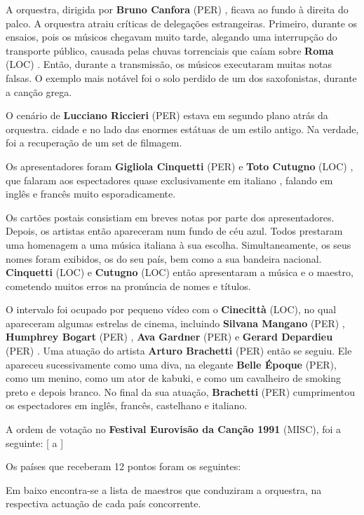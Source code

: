 \documentclass[12pt,a4paper]{article}
\begin{document}
A orquestra, dirigida por \textbf{Bruno Canfora} (PER) , ficava ao fundo à direita do palco. A orquestra atraiu críticas de delegações estrangeiras. Primeiro, durante os ensaios, pois os músicos chegavam muito tarde, alegando uma interrupção do transporte público, causada pelas chuvas torrenciais que caíam sobre \textbf{Roma} (LOC) . Então, durante a transmissão, os músicos executaram muitas notas falsas. O exemplo mais notável foi o solo perdido de um dos saxofonistas, durante a canção grega.

O cenário de \textbf{Lucciano Riccieri} (PER) estava em segundo plano atrás da orquestra. cidade e no lado das enormes estátuas de um estilo antigo. Na verdade, foi a recuperação de um set de filmagem.

Os apresentadores foram \textbf{Gigliola Cinquetti} (PER) e \textbf{Toto Cutugno} (LOC) , que falaram aos espectadores quase exclusivamente em italiano , falando em inglês e francês muito esporadicamente.

Os cartões postais consistiam em breves notas por parte dos apresentadores. Depois, os artistas então apareceram num fundo de céu azul. Todos prestaram uma homenagem a uma música italiana à sua escolha. Simultaneamente, os seus nomes foram exibidos, os do seu país, bem como a sua bandeira nacional. \textbf{Cinquetti} (LOC) e \textbf{Cutugno} (LOC) então apresentaram a música e o maestro, cometendo muitos erros na pronúncia de nomes e títulos.

O intervalo foi ocupado por pequeno vídeo com o \textbf{Cinecittà} (LOC), no qual apareceram algumas estrelas de cinema, incluindo \textbf{Silvana Mangano} (PER) , \textbf{Humphrey Bogart} (PER) , \textbf{Ava Gardner} (PER) e \textbf{Gerard Depardieu} (PER) . Uma atuação do artista \textbf{Arturo Brachetti} (PER) então se seguiu. Ele apareceu sucessivamente como uma diva, na elegante \textbf{Belle Époque} (PER), como um menino, como um ator de kabuki, e como um cavalheiro de smoking preto e depois branco. No final da sua atuação, \textbf{Brachetti} (PER) cumprimentou os espectadores em inglês, francês, castelhano e italiano.

A ordem de votação no \textbf{Festival Eurovisão da Canção 1991} (MISC), foi a seguinte: [ a ]

Os países que receberam 12 pontos foram os seguintes:

Em baixo encontra-se a lista de maestros que conduziram a orquestra, na respectiva actuação de cada país concorrente.
\end{document}
